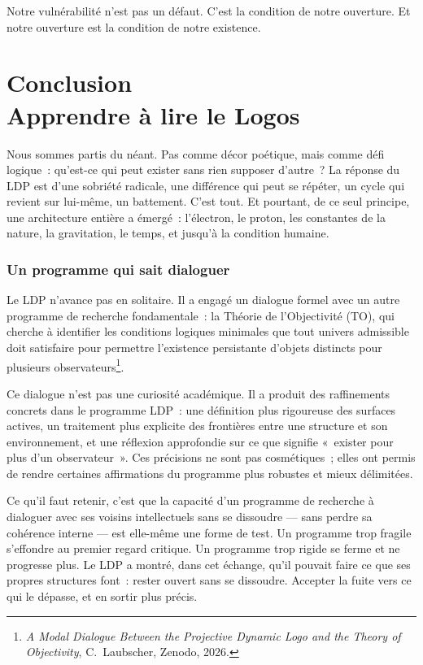 \documentclass[12pt, a4paper, openright]{book}
\begin{document}
\medskip

Notre vulnérabilité n'est pas un défaut. C'est la condition de notre ouverture. Et notre ouverture est la condition de notre existence.

\chapter[Conclusion -- Apprendre à lire le Logos]{Conclusion \\ Apprendre à lire le Logos}

Nous sommes partis du néant. Pas comme décor poétique, mais comme défi logique~: qu'est-ce qui peut exister sans rien supposer d'autre~? La réponse du LDP est d'une sobriété radicale, une différence qui peut se répéter, un cycle qui revient sur lui-même, un battement. C'est tout. Et pourtant, de ce seul principe, une architecture entière a émergé~: l'électron, le proton, les constantes de la nature, la gravitation, le temps, et jusqu'à la condition humaine.

\subsection*{Un programme qui sait dialoguer}

Le LDP n'avance pas en solitaire. Il a engagé un dialogue formel avec un autre programme de recherche fondamentale~: la Théorie de l'Objectivité (TO), qui cherche à identifier les conditions logiques minimales que tout univers admissible doit satisfaire pour permettre l'existence persistante d'objets distincts pour plusieurs observateurs\footnote{\textit{A Modal Dialogue Between the Projective Dynamic Logo and the Theory of Objectivity}, C.~Laubscher, Zenodo, 2026.}.

\medskip

Ce dialogue n'est pas une curiosité académique. Il a produit des raffinements concrets dans le programme LDP~: une définition plus rigoureuse des surfaces actives, un traitement plus explicite des frontières entre une structure et son environnement, et une réflexion approfondie sur ce que signifie «~exister pour plus d'un observateur~». Ces précisions ne sont pas cosmétiques~; elles ont permis de rendre certaines affirmations du programme plus robustes et mieux délimitées.

\medskip

Ce qu'il faut retenir, c'est que la capacité d'un programme de recherche à dialoguer avec ses voisins intellectuels sans se dissoudre --- sans perdre sa cohérence interne --- est elle-même une forme de test. Un programme trop fragile s'effondre au premier regard critique. Un programme trop rigide se ferme et ne progresse plus. Le LDP a montré, dans cet échange, qu'il pouvait faire ce que ses propres structures font~: rester ouvert sans se dissoudre. Accepter la fuite vers ce qui le dépasse, et en sortir plus précis.
\end{document}
